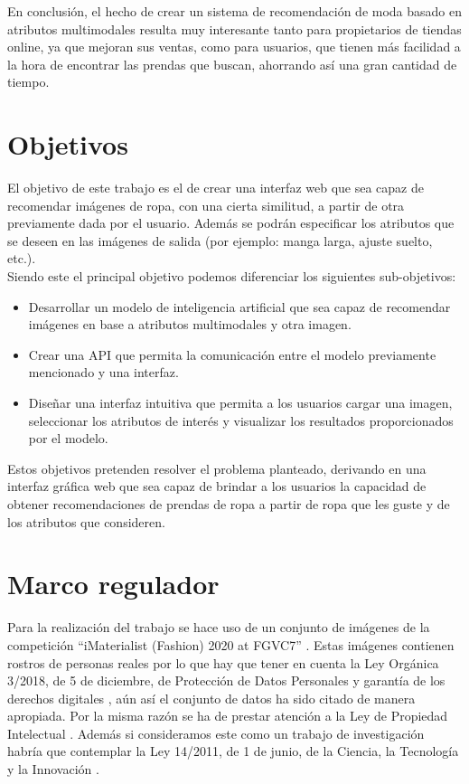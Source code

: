 \documentclass[12pt]{report} %
\begin{document}
	En conclusión, el hecho de crear un sistema de recomendación de moda basado en atributos multimodales
	resulta muy interesante tanto para propietarios de tiendas online, ya que mejoran sus ventas, como para
	usuarios, que tienen más facilidad a la hora de encontrar las prendas que buscan, ahorrando así una
	gran cantidad de tiempo.

	\section{Objetivos}
	El objetivo de este trabajo es el de crear una interfaz web que sea capaz de recomendar imágenes de
	ropa, con una cierta similitud, a partir de otra previamente dada por el usuario. Además se podrán 
	especificar los atributos que se deseen en las imágenes de salida (por ejemplo: manga larga, ajuste suelto, etc.).
	\\
	Siendo este el principal objetivo podemos diferenciar los siguientes sub-objetivos:
	\begin{itemize}
		\item Desarrollar un modelo de inteligencia artificial que sea capaz de recomendar imágenes en base a atributos multimodales y otra imagen.
		\item Crear una API que permita la comunicación entre el modelo previamente mencionado y una interfaz.
		\item Diseñar una interfaz intuitiva que permita a los usuarios cargar una imagen, seleccionar los atributos de interés y visualizar los resultados proporcionados por el modelo.
	\end{itemize}

	Estos objetivos pretenden resolver el problema planteado, derivando en una interfaz gráfica web
	que sea capaz de brindar a los usuarios la capacidad de obtener recomendaciones de prendas 
	de ropa a partir de ropa que les guste y de los atributos que consideren. 
	\section{Marco regulador}
	Para la realización del trabajo se hace uso de un conjunto de imágenes de la competición
	``iMaterialist (Fashion) 2020 at FGVC7'' \cite{imaterialist}. Estas imágenes contienen
	rostros de personas reales por lo que  hay que tener en cuenta la Ley Orgánica 3/2018, de 5 de diciembre, 
	de Protección de Datos Personales y garantía de los derechos digitales \cite{ley-proteccion-datos}, aún así el conjunto de datos
	ha sido citado de manera apropiada. Por la misma razón se ha de prestar atención a la Ley de Propiedad Intelectual \cite{ley-propiedad-intelectual}. 
	Además si consideramos este como un trabajo de investigación habría que contemplar la
	Ley 14/2011, de 1 de junio, de la Ciencia, la Tecnología y la Innovación \cite{ley-tecnologia}.
\end{document}
